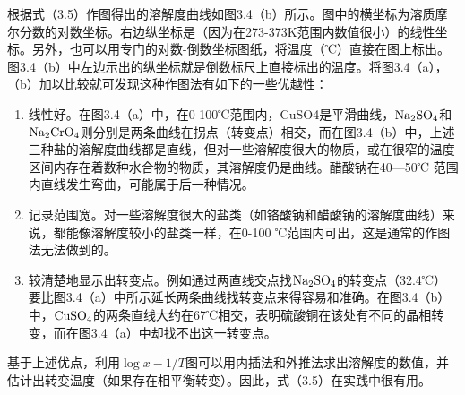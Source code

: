 根据式（3.5）作图得出的溶解度曲线如图3.4（b）所示。图中的横坐标为溶质摩尔分数的对数坐标。右边纵坐标是（因为在273-373K范围内数值很小）的线性坐标。另外，也可以用专门的对数-倒数坐标图纸，将温度（℃）直接在图上标出。图3.4（b）中左边示出的纵坐标就是倒数标尺上直接标出的温度。将图3.4（a），（b）加以比较就可发现这种作图法有如下的一些优越性：
\begin{enumerate}[(1)]\itemsep -0.5ex
\item 线性好。在图3.4（a）中，在0-100℃范围内，CuSO4是平滑曲线，$\rm Na_2SO_4$和$\rm Na_2CrO_4$则分别是两条曲线在拐点（转变点）相交，而在图3.4（b）中，上述三种盐的溶解度曲线都是直线，但对一些溶解度很大的物质，或在很窄的温度区间内存在着数种水合物的物质，其溶解度仍是曲线。醋酸钠在40—50℃ 范围内直线发生弯曲，可能属于后一种情况。
\item 记录范围宽。对一些溶解度很大的盐类（如铬酸钠和醋酸钠的溶解度曲线）来说，都能像溶解度较小的盐类一样，在0-100 ℃范围内可出，这是通常的作图法无法做到的。
\item 较清楚地显示出转变点。例如通过两直线交点找$\rm Na_2SO_4$的转变点（32.4℃）要比图3.4（a）中所示延长两条曲线找转变点来得容易和准确。在图3.4（b）中，$\rm CuSO_4$的两条直线大约在67℃相交，表明硫酸铜在该处有不同的晶相转变，而在图3.4（a）中却找不出这一转变点。
\end{enumerate}

基于上述优点，利用$\log{x}-1/T$图可以用内插法和外推法求出溶解度的数值，并估计出转变温度（如果存在相平衡转变）。因此，式（3.5）在实践中很有用。
